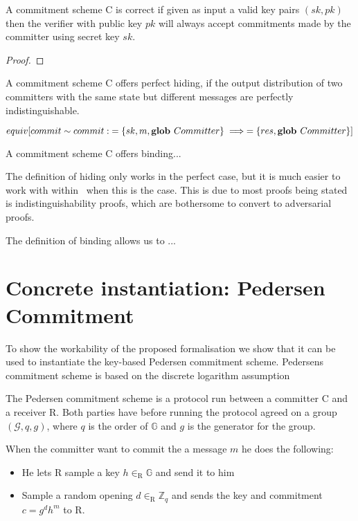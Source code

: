 \begin{lemma}
  A commitment scheme C is correct if given as input a valid key pairs
  $(sk, pk)$ then the verifier with public key $pk$ will always accept
  commitments made by the committer using secret key $sk$.
\end{lemma}
\begin{proof}

\end{proof}

\begin{definition}
  \label{def:commitment:perfect-hiding}
  A commitment scheme C offers perfect hiding, if the output distribution of two
  committers with the same state but different messages are perfectly
  indistinguishable.

  \[
    equiv[commit \sim commit :\; =\{sk, m, \textbf{glob } Committer\} \implies =\{res, \textbf{glob } Committer\} ]
  \]

\end{definition}

\begin{definition}
  \label{def:commitment:alt-binding}
  A commitment scheme C offers binding...
\end{definition}

The definition of hiding only works in the perfect case, but it is much easier
to work with within \easycrypt\  when this is the case. This is due to most
proofs being stated is indistinguishability proofs, which are bothersome to
convert to adversarial proofs.

The definition of binding allows us to ...


\section{Concrete instantiation: Pedersen Commitment}
\label{sec:pedersen}

To show the workability of the proposed formalisation we show that it can be
used to instantiate the key-based Pedersen commitment scheme. Pedersens
commitment scheme is based on the discrete logarithm assumption


The Pedersen commitment scheme is a protocol run between a committer C and a
receiver R. Both parties have before running the protocol agreed on a group
$(\mathcal{G}, q, g)$, where $q$ is the order of $\mathbb{G}$ and $g$ is the
generator for the group.

When the committer want to commit the a message $m$ he does the following:
\begin{itemize}
  \item He lets R sample a key $h \in_{\text{R}} \mathbb{G}$ and send it to him
  \item Sample a random opening $d \in_{\text{R}} \mathbb{Z}_{q}$ and sends the
    key and commitment $c = g^{d}h^{m}$ to R.
\end{itemize}


